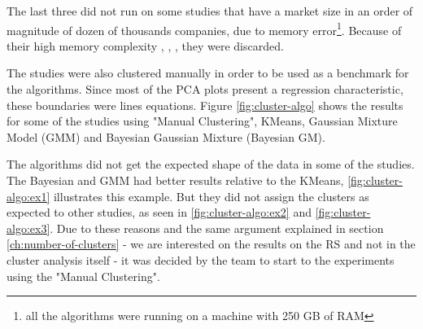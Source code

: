 The last three did not run on some studies that have a market size in an order of magnitude of dozen of thousands companies, due to memory error\footnote{all the algorithms were running on a machine with 250 GB of RAM}. Because of their high memory complexity \cite{franti2006fast}, \cite{ester1996density}, \cite{yan2009fast}, they were discarded.

The studies were also clustered manually in order to be used as a benchmark for the algorithms. Since most of the PCA plots present a regression characteristic, these boundaries were lines equations. Figure \ref{fig:cluster-algo} shows the results for some of the studies using "Manual Clustering", KMeans, Gaussian Mixture Model (GMM) and Bayesian Gaussian Mixture (Bayesian GM).

The algorithms did not get the expected shape of the data in some of the studies. The Bayesian and GMM had better results relative to the KMeans, \ref{fig:cluster-algo:ex1} illustrates this example. But they did not assign the clusters as expected to other studies, as seen in \ref{fig:cluster-algo:ex2} and \ref{fig:cluster-algo:ex3}. Due to these reasons and the same argument explained in section \ref{ch:number-of-clusters} - we are interested on the results on the RS and not in the cluster analysis itself - it was decided by the team to start to the experiments using the "Manual Clustering".

